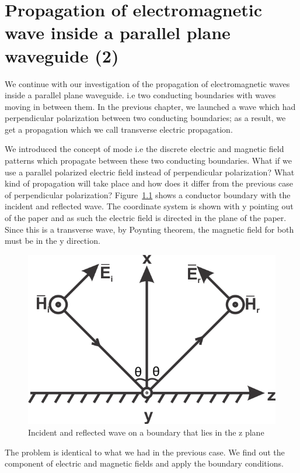 \chapter{Propagation of electromagnetic wave inside a parallel plane waveguide (2)}
We continue with our investigation of the propagation of electromagnetic waves inside a parallel plane waveguide. i.e two conducting boundaries with waves moving in between them. In the previous chapter, we launched a wave which had perpendicular polarization between two conducting boundaries; as a result, we get a propagation which we call transverse electric propagation.

We introduced the concept of mode i.e the discrete electric and magnetic field patterns which propagate between these two conducting boundaries. What if we use a parallel polarized electric field instead of perpendicular polarization? What kind of propagation will take place and how does it differ from the previous case of perpendicular polarization? Figure~\ref{fig:silas1} shows a conductor boundary with the incident and reflected wave. The coordinate system is shown with y pointing out of the paper and as such the electric field is directed in the plane of the paper. Since this is a transverse wave, by Poynting theorem, the magnetic field for both must be in the y direction.
\begin{figure}[h]
\centering
\includegraphics[scale=1]{./graphics/silas1}
\caption{Incident and reflected wave on a boundary that lies in the z plane}
\label{fig:silas1}
\end{figure}
The problem is identical to what we had in the previous case. We find out the component of electric and magnetic fields and apply the boundary conditions.
